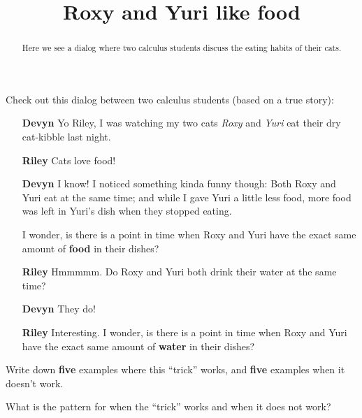 \documentclass{ximera}
\title[Break-Ground:]{Roxy and Yuri like food}
\begin{document}
\begin{abstract}
Here we see a dialog where two calculus students discuss the eating
habits of their cats.
\end{abstract}
\maketitle

Check out this dialog between two calculus students (based on a true
story):

\begin{itemize}
  \item[\textbf{Devyn}] Yo Riley, I was watching my two cats
    \textit{Roxy} and \textit{Yuri} eat their dry cat-kibble last
    night.
\item[\textbf{Riley}] Cats love food!
\item[\textbf{Devyn}] I know! I noticed something kinda funny though:
  Both Roxy and Yuri eat at the same time; and while I gave Yuri a
  little less food, more food was left in Yuri's dish when they
  stopped eating.

  I wonder, is there is a point in time when Roxy and Yuri have the
  exact same amount of \textbf{food} in their dishes?
\item[\textbf{Riley}] Hmmmmm. Do Roxy and Yuri both drink their water
  at the same time?
  \item[\textbf{Devyn}] They do!
\item[\textbf{Riley}] Interesting. I wonder, is there is a point in
  time when Roxy and Yuri have the exact same amount of \textbf{water}
  in their dishes?
\end{itemize}

\begin{problem}
  Write down \textbf{five} examples where this ``trick'' works, and
  \textbf{five} examples when it doesn't work.
  \begin{freeResponse}
\end{freeResponse}
\end{problem}

\begin{problem}
  What is the pattern for when the ``trick'' works and when it does not work?
  \begin{freeResponse}
\end{freeResponse}
\end{problem}
\end{document}
